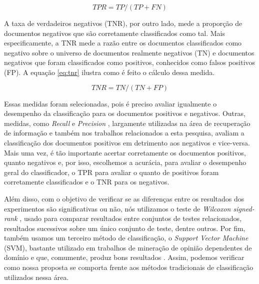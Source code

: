 \documentclass[template.tex]{subfiles}
\begin{document}
\begin{equation}
TPR = TP / (TP + FN)
\label{eq:tpr}
\end{equation}

A taxa de verdadeiros negativos (TNR), por outro lado, mede a proporção de documentos negativos que são corretamente classificados como tal. Mais especificamente, a TNR mede a razão entre os documentos classificados como negativo sobre o universo de documentos realmente negativos (TN) e documentos negativos que foram classificados como positivos, conhecidos como falsos positivos (FP). A equação \ref{eq:tnr} ilustra como é feito o cálculo dessa medida. 

\begin{equation}
TNR = TN / (TN + FP)
\label{eq:tnr}
\end{equation}


Essas medidas foram selecionadas, pois é preciso avaliar igualmente o desempenho da classificação para os documentos positivos e negativos. Outras, medidas, como \textit{Recall} e \textit{Precision} \cite{zhu2004recall}, largamente utilizadas na área de recuperação de informação e também nos trabalhos relacionados a esta pesquisa, avaliam a classificação dos documentos positivos em detrimento aos negativos e vice-versa. Mais uma vez, é tão importante acertar corretamente os documentos positivos, quanto negativos e, por isso, escolhemos a acurácia, para avaliar o desempenho geral do classificador, o TPR para avaliar o quanto de positivos foram corretamente classificados e o TNR para os negativos.

Além disso, com o objetivo de verificar se as diferenças entre os resultados dos experimentos são significativas ou não, nós utilizamos o teste de \textit{Wilcoxon signed-rank} \cite{wilcoxon1945individual}, usado para comparar resultados entre conjuntos de testes relacionados, resultados sucessivos sobre um único conjunto de teste, dentre outros. Por fim, também usamos um terceiro método de classificação, o \textit{Support Vector Machine} (SVM), bastante utilizado em trabalhos de mineração de opinião dependentes de domínio e que, comumente, produz bons resultados \cite{ohana2009sentiment, moraes2012document}. Assim, podemos verificar como nossa proposta se comporta frente aos métodos tradicionais de classificação utilizados nessa área. 
\end{document}
